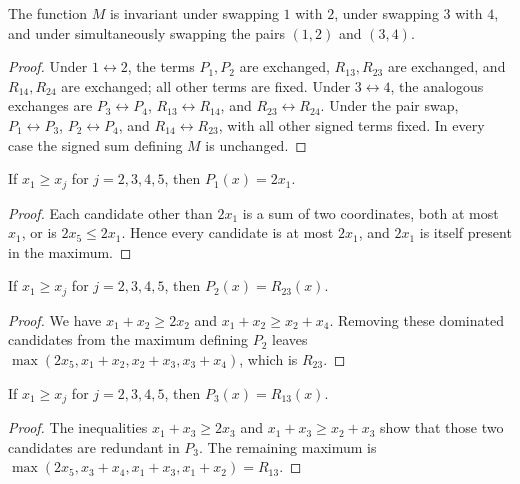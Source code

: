 \begin{lemma}[Symmetries of $M$]
  \label{lem:m-symmetry}
  The function $M$ is invariant under swapping $1$ with $2$, under swapping
  $3$ with $4$, and under simultaneously swapping the pairs $(1,2)$ and
  $(3,4)$.
\end{lemma}
\begin{proof}
  Under $1\leftrightarrow2$, the terms $P_1,P_2$ are exchanged,
  $R_{13},R_{23}$ are exchanged, and $R_{14},R_{24}$ are exchanged; all other
  terms are fixed.  Under $3\leftrightarrow4$, the analogous exchanges are
  $P_3\leftrightarrow P_4$, $R_{13}\leftrightarrow R_{14}$, and
  $R_{23}\leftrightarrow R_{24}$.  Under the pair swap,
  $P_1\leftrightarrow P_3$, $P_2\leftrightarrow P_4$, and
  $R_{14}\leftrightarrow R_{23}$, with all other signed terms fixed.
  In every case the signed sum defining $M$ is unchanged.
\end{proof}

\begin{lemma}
  \label{lem:p1-x1-case}
  If $x_1\geq x_j$ for $j=2,3,4,5$, then $P_1(x)=2x_1$.
\end{lemma}
\begin{proof}
  Each candidate other than $2x_1$ is a sum of two coordinates, both at most
  $x_1$, or is $2x_5\leq2x_1$.  Hence every candidate is at most $2x_1$, and
  $2x_1$ is itself present in the maximum.
\end{proof}

\begin{lemma}[$P_2$ cancels $R_{23}$]
  \label{lem:p2-r23-x1-case}
  If $x_1\geq x_j$ for $j=2,3,4,5$, then $P_2(x)=R_{23}(x)$.
\end{lemma}
\begin{proof}
  We have $x_1+x_2\geq2x_2$ and
  $x_1+x_2\geq x_2+x_4$.  Removing these dominated candidates from the
  maximum defining $P_2$ leaves
  $\max(2x_5,x_1+x_2,x_2+x_3,x_3+x_4)$, which is $R_{23}$.
\end{proof}

\begin{lemma}[$P_3$ cancels $R_{13}$]
  \label{lem:p3-r13-x1-case}
  If $x_1\geq x_j$ for $j=2,3,4,5$, then $P_3(x)=R_{13}(x)$.
\end{lemma}
\begin{proof}
  The inequalities $x_1+x_3\geq2x_3$ and
  $x_1+x_3\geq x_2+x_3$ show that those two candidates are redundant in
  $P_3$.  The remaining maximum is
  $\max(2x_5,x_3+x_4,x_1+x_3,x_1+x_2)=R_{13}$.
\end{proof}

